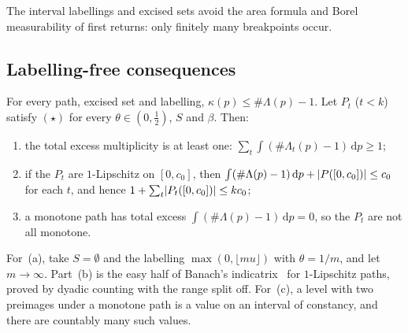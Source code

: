 The interval labellings and excised sets avoid the area formula and Borel measurability of first
returns: only finitely many breakpoints occur.

\subsection{Labelling-free consequences}

\begin{theorem}\label{thm:excess}
For every path, excised set and labelling, $\kappa(p)\le\#\Lambda(p)-1$. Let $P_t$ ($t<k$) satisfy
$(\star)$ for every $\theta\in(0,\tfrac12)$, $S$ and $\beta$. Then:
\begin{enumerate}[label=(\alph*)]
\item the total excess multiplicity is at least one:
$\sum_t\int(\#\Lambda_t(p)-1)\,\mathrm{d}p\ge1$;
\item if the $P_t$ are $1$-Lipschitz on $[0,c_0]$, then
$\int(\#\Lambda(p)-1)\,\mathrm{d}p+\lvert P([0,c_0]) \rvert\le c_0$ for each $t$, and hence
$1+\sum_t\lvert P_t([0,c_0]) \rvert\le kc_0$;
\item a monotone path has total excess $\int(\#\Lambda(p)-1)\,\mathrm{d}p=0$, so the $P_t$ are not all monotone.
\end{enumerate}
\end{theorem}

\begin{outline}
For~(a), take $S=\emptyset$ and the labelling $\max(0,\lfloor mu\rfloor)$ with $\theta=1/m$, and let
$m\to\infty$. Part~(b) is the easy half of Banach's indicatrix~\cite{Banach1925} for $1$-Lipschitz
paths, proved by dyadic counting with the range split off. For~(c), a level with two preimages
under a monotone path is a value on an interval of constancy, and there are countably many such
values.
\end{outline}

